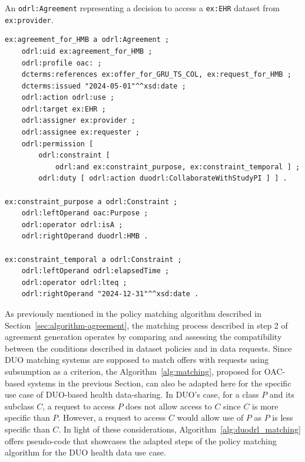 \begin{listing}[htp]
\caption[\texttt{odrl:Agreement} representing an access decision.]{An \texttt{odrl:Agreement} representing a decision to access a \texttt{ex:EHR} dataset from \texttt{ex:provider}.}
\label{list:duodrl_agreement}
\begin{verbatim}
ex:agreement_for_HMB a odrl:Agreement ;
    odrl:uid ex:agreement_for_HMB ;
    odrl:profile oac: ;
    dcterms:references ex:offer_for_GRU_TS_COL, ex:request_for_HMB ;
    dcterms:issued "2024-05-01"^^xsd:date ;
    odrl:action odrl:use ;
    odrl:target ex:EHR ;
    odrl:assigner ex:provider ;
    odrl:assignee ex:requester ;
    odrl:permission [
        odrl:constraint [
            odrl:and ex:constraint_purpose, ex:constraint_temporal ] ;
        odrl:duty [ odrl:action duodrl:CollaborateWithStudyPI ] ] .

ex:constraint_purpose a odrl:Constraint ;
    odrl:leftOperand oac:Purpose ;
    odrl:operator odrl:isA ;
    odrl:rightOperand duodrl:HMB .

ex:constraint_temporal a odrl:Constraint ;
    odrl:leftOperand odrl:elapsedTime ;
    odrl:operator odrl:lteq ;
    odrl:rightOperand "2024-12-31"^^xsd:date .
\end{verbatim}
\end{listing}

As previously mentioned in the policy matching algorithm described in Section~\ref{sec:algorithm-agreement}, the matching process described in step 2 of agreement generation operates by comparing and assessing the compatibility between the conditions described in dataset policies and in data requests.
Since DUO matching systems are supposed to match offers with requests using subsumption as a criterion, the Algorithm~\ref{alg:matching}, proposed for OAC-based systems in the previous Section, can also be adapted here for the specific use case of DUO-based health data-sharing. 
In DUO's case, for a class $P$ and its subclass $C$, a request to access $P$ does not allow access to $C$ since $C$ is more specific than $P$.
However, a request to access $C$ would allow use of $P$ as $P$ is less specific than $C$.
In light of these considerations, Algorithm~\ref{alg:duodrl_matching} offers pseudo-code that showcases the adapted steps of the policy matching algorithm for the DUO health data use case.

